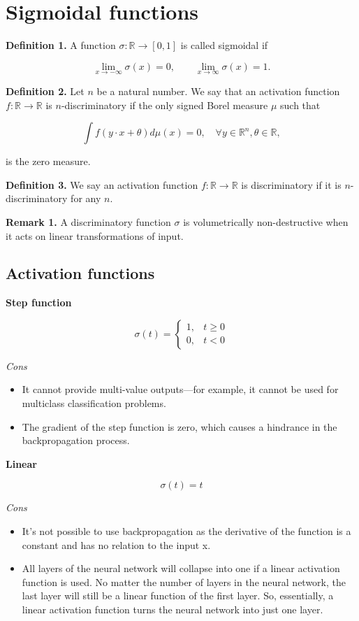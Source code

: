 \section{Sigmoidal functions}
\textbf{Definition 1.} A function $\sigma: \mathbb{R}\rightarrow [0,1]$ is called sigmoidal if

$$
\lim_{x\rightarrow -\infty}\sigma(x)=0, \qquad \lim_{x\rightarrow \infty}\sigma(x)=1.
$$

\textbf{Definition 2.} Let $n$ be a natural number. We say that an activation function $f:\mathbb{R} \rightarrow \mathbb{R}$ is $n$-discriminatory if the only signed Borel measure $\mu$ such that

$$
\int f(y\cdot x+\theta)d\mu(x)=0, \quad \forall y\in\mathbb{R}^n, \theta\in \mathbb{R},
$$

is the zero measure.

\textbf{Definition 3.} We say an activation function $f:\mathbb{R} \rightarrow \mathbb{R}$ is discriminatory if it is $n$-discriminatory for any $n$.

\textbf{Remark 1.} A discriminatory function $\sigma$ is volumetrically non-destructive when it acts on linear transformations of input.


\subsection{Activation functions}
\textbf{Step function}

$$\sigma(t)=
\left\{
  \begin{array}{ll}
  1, & t\geq 0 \\
  0, & t<0
  \end{array}
\right.
$$

\textit{Cons}

\begin{itemize}
  \item It cannot provide multi-value outputs—for example, it cannot be used for multiclass
classification problems.
  \item The gradient of the step function is zero, which causes a hindrance in the
backpropagation process.
\end{itemize}

\textbf{Linear}

$$\sigma(t)=t$$

\textit{Cons}

\begin{itemize}
  \item It’s not possible to use backpropagation as the derivative of the function is a
constant and has no relation to the input x.
  \item All layers of the neural network will collapse into one if a linear activation
function is used. No matter the number of layers in the neural network, the last
layer will still be a linear function of the first layer. So, essentially, a linear
activation function turns the neural network into just one layer.
\end{itemize}

